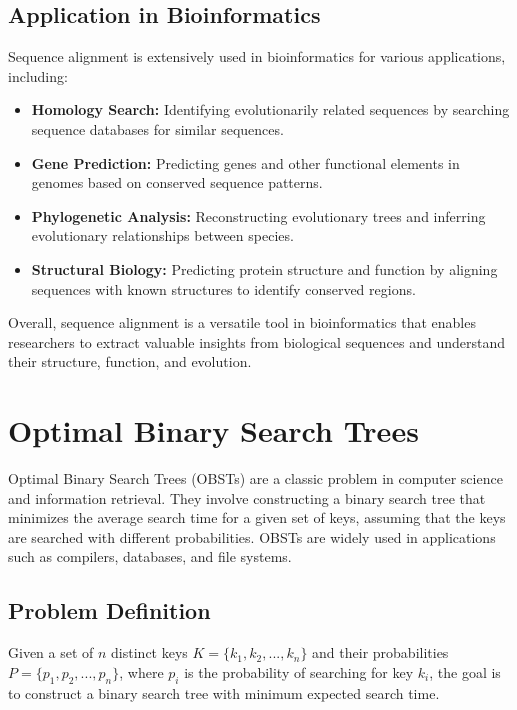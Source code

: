 \documentclass[12pt]{book} %
\begin{document}
\subsection{Application in Bioinformatics}

Sequence alignment is extensively used in bioinformatics for various applications, including:
\begin{itemize}
    \item \textbf{Homology Search:} Identifying evolutionarily related sequences by searching sequence databases for similar sequences.
    \item \textbf{Gene Prediction:} Predicting genes and other functional elements in genomes based on conserved sequence patterns.
    \item \textbf{Phylogenetic Analysis:} Reconstructing evolutionary trees and inferring evolutionary relationships between species.
    \item \textbf{Structural Biology:} Predicting protein structure and function by aligning sequences with known structures to identify conserved regions.
\end{itemize}

Overall, sequence alignment is a versatile tool in bioinformatics that enables researchers to extract valuable insights from biological sequences and understand their structure, function, and evolution.

\section{Optimal Binary Search Trees}

Optimal Binary Search Trees (OBSTs) are a classic problem in computer science and information retrieval. They involve constructing a binary search tree that minimizes the average search time for a given set of keys, assuming that the keys are searched with different probabilities. OBSTs are widely used in applications such as compilers, databases, and file systems.

\subsection{Problem Definition}

Given a set of \(n\) distinct keys \(K = \{k_1, k_2, ..., k_n\}\) and their probabilities \(P = \{p_1, p_2, ..., p_n\}\), where \(p_i\) is the probability of searching for key \(k_i\), the goal is to construct a binary search tree with minimum expected search time.
\end{document}
